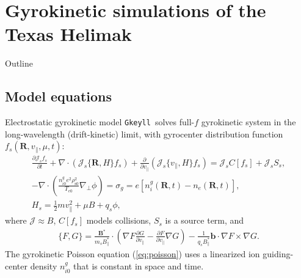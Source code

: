 \documentclass[12pt,table]{beamer}
\newcommand{\gke}{{\tt Gkeyll}}
\begin{document}
\section{Gyrokinetic simulations of the Texas Helimak}
\begin{frame}{Outline}
    \tableofcontents[currentsection] 
\end{frame}

\subsection{Model equations}

\begin{frame}{Electrostatic gyrokinetic model}
    \small
    \gke\ solves full-$f$ gyrokinetic system in the long-wavelength (drift-kinetic) limit, with gyrocenter distribution function $f_s(\bm{R}, v_\parallel, \mu,t)$:
    \begin{gather}
    \frac{\partial \mathcal{J}_s f_s}{\partial t} + \nabla \cdot (\mathcal{J}_s \{\bm{R},H\} f_s) + \frac{\partial}{\partial v_\parallel} (\mathcal{J}_s \{v_\parallel, H\} f_s ) =\mathcal{J}_s C[f_s] + \mathcal{J}_s S_s,     \label{eq:gk-eqn} \\
    -\nabla \cdot \left( \frac{n_{i0}^g e^2 \rho_{\mathrm{s}0}^2}{T_{e0}} \nabla_\perp \phi \right) = \sigma_g = e [n_i^g(\bm{R},t) - n_e(\bm{R},t)], \label{eq:poisson} \\
    H_s = \frac{1}{2}mv_\parallel^2 + \mu B + q_s\phi, \label{eq:ham}
    \end{gather}
    where $\mathcal{J} \approx B$, $C[f_s]$ models collisions, $S_s$ is a source term, and 
    \begin{gather*}
        \{F,G\} = \frac{\bm{B}^*}{m_s B_\parallel^*} \cdot \left( \nabla F \frac{\partial G}{\partial v_\parallel} - \frac{\partial F}{\partial v_\parallel} \nabla G \right) - \frac{1}{q_s B_\parallel^*} \bm{b} \cdot \nabla F \times \nabla G.
    \end{gather*}
    The gyrokinetic Poisson equation (\ref{eq:poisson}) uses a linearized ion guiding-center density $n_{i0}^g$ that is constant in space and time.
\end{frame}
\end{document}
